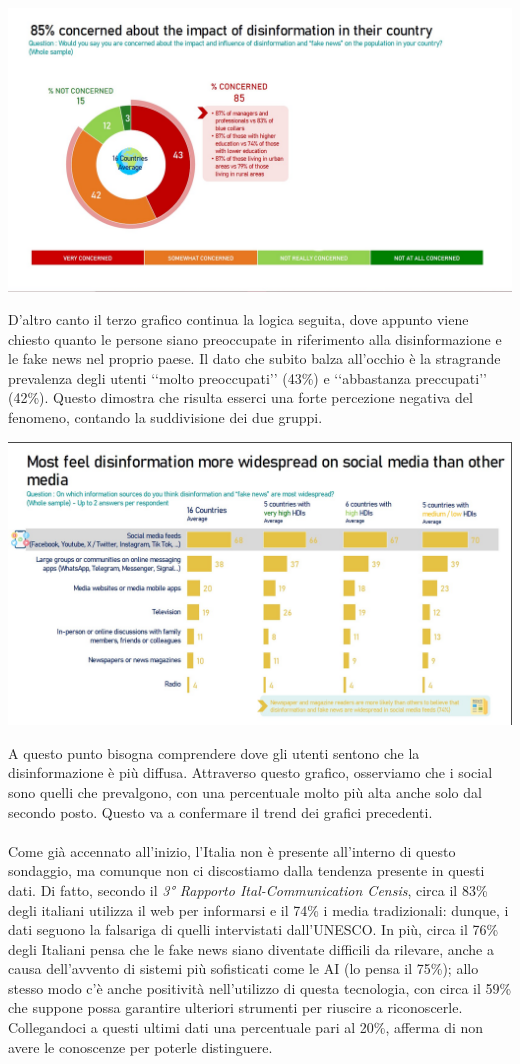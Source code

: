 \documentclass{article}
\begin{document}
\begin{justify}
\begin{center}
\includegraphics[width=0.5\linewidth]{Immagini/Grafico3.jpg}
\end{center}
    D'altro canto il terzo grafico continua la logica seguita, dove appunto viene chiesto quanto le persone siano preoccupate in riferimento alla disinformazione e le fake news nel proprio paese.
    Il dato che subito balza all'occhio è la stragrande prevalenza degli utenti ‘‘molto preoccupati’’ (43\%) e ‘‘abbastanza preccupati’’ (42\%). Questo dimostra che risulta esserci una forte percezione negativa del fenomeno, contando la suddivisione dei due gruppi.

\begin{center}
\includegraphics[width=0.5\linewidth]{Immagini/Grafico4.jpg}
\end{center}
    A questo punto bisogna comprendere dove gli utenti sentono che la disinformazione è più diffusa. Attraverso questo grafico, osserviamo che i social sono quelli che prevalgono, con una percentuale molto più alta anche solo dal secondo posto. Questo va a confermare il trend dei grafici precedenti.\\
    \\
    Come già accennato all'inizio, l'Italia non è presente all'interno di questo sondaggio, ma comunque non ci discostiamo dalla tendenza presente in questi dati.
    Di fatto, secondo il \textit{3° Rapporto Ital-Communication Censis}, circa il 83\% degli italiani utilizza il web per informarsi e il 74\% i media tradizionali: dunque, i dati seguono la falsariga di quelli intervistati dall'UNESCO.
    In più, circa il 76\% degli Italiani pensa che le fake news siano diventate difficili da rilevare, anche a causa dell'avvento di sistemi più sofisticati come le AI (lo pensa il 75\%); allo stesso modo c'è anche positività nell'utilizzo di questa tecnologia, con circa il 59\% che suppone possa garantire ulteriori strumenti per riuscire a riconoscerle.
    Collegandoci a questi ultimi dati una percentuale pari al 20\%, afferma di non avere le conoscenze per poterle distinguere.\citep{chiariello_disinformazione_2023}
\end{justify}
\end{document}
